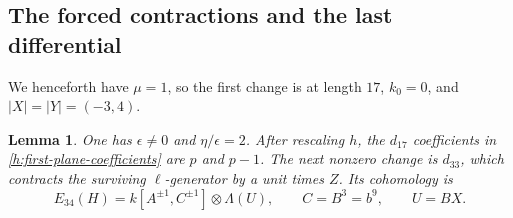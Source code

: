 \documentclass[11pt]{article}
\newtheorem{lemma}[theorem]{Lemma}
\theoremstyle{definition}
\theoremstyle{remark}
\numberwithin{equation}{section}
\begin{document}
\subsection{The forced contractions and the last differential}

We henceforth have $\mu=1$, so the first change is at length $17$,
$k_0=0$, and $|X|=|Y|=(-3,4)$.

\begin{lemma}
 \label{h:d17-d33}
 One has $\epsilon\ne0$ and $\eta/\epsilon=2$. After rescaling $h$,
 the $d_{17}$ coefficients in \eqref{h:first-plane-coefficients} are
 $p$ and $p-1$. The next nonzero change is $d_{33}$, which contracts
 the surviving $\ell$-generator by a unit times $Z$. Its cohomology
 is
 \begin{equation}
 \label{h:e34}
 E_{34}(H)=k[A^{\pm1},C^{\pm1}]\otimes\Lambda(U),
 \qquad C=B^3=b^9,\qquad U=BX.
 \end{equation}
\end{lemma}
\end{document}
